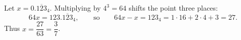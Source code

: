 Let $x=0.\overline{123}_4$. Multiplying by $4^3=64$ shifts the point three places:
\[
64x=123.\overline{123}_4,\qquad\text{so}\qquad 64x-x=123_4=1\cdot16+2\cdot4+3=27 .
\]
Thus $x=\dfrac{27}{63}=\boxed{\dfrac{3}{7}}$.
